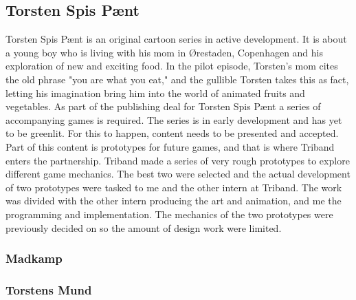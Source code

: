 \subsection{Torsten Spis P{{\ae}}nt}
Torsten Spis P{\ae}nt is an original cartoon series in active development. It is about a young boy who is living with his mom in {\O}restaden, Copenhagen and his exploration of new and exciting food. In the pilot episode, Torsten's mom cites the old phrase "you are what you eat," and the gullible Torsten takes this as fact, letting his imagination bring him into the world of animated fruits and vegetables. \newline
As part of the publishing deal for Torsten Spis P{\ae}nt a series of accompanying games is required. The series is in early development and has yet to be greenlit. For this to happen, content needs to be presented and accepted. Part of this content is prototypes for future games, and that is where Triband enters the partnership. Triband made a series of very rough prototypes to explore different game mechanics. The best two were selected and the actual development of two prototypes were tasked to me and the other intern at Triband. The work was divided with the other intern producing the art and animation, and me the programming and implementation. The mechanics of the two prototypes were previously decided on so the amount of design work were limited.

\subsubsection{Madkamp}


\subsubsection{Torstens Mund}
